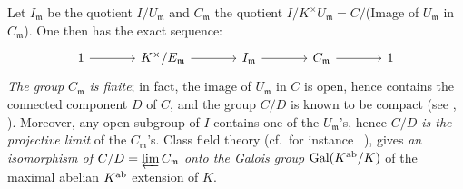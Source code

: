 Let $I_{\mathfrak{m}}$ be the quotient
$I/U_{\mathfrak{m}}$ and $C_{\mathfrak{m}}$ the
quotient $I/K^\times U_{\mathfrak{m}} = C/$(Image of $U_{\mathfrak{m}}$ in
$C_{\mathfrak{m}}$). One then has the exact sequence:
\[\begin{tikzcd}[sep=large]
	1 \rar & K^\times/E_{\mathfrak{m}} \rar & I_{\mathfrak{m}} \rar &
	C_{\mathfrak{m}} \rar & 1
\end{tikzcd}\]
\emph{The group $C_{\mathfrak{m}}$ is finite}; in fact, the image of
$U_{\mathfrak{m}}$ in $C$ is open, hence contains the connected component
$D$ of $C$, and the group $C/D$ is known to be compact (see
\cite{13}, \cite{44}).  Moreover, any open subgroup of $I$ contains one of the
$U_{\mathfrak{m}}$'s, hence \emph{$C/D$ is the projective limit} of the
$C_{\mathfrak{m}}$'s. Class field theory (cf.\ for instance
\citeauthor{6}~\cite{6}), gives \emph{an isomorphism of $C/D = \varprojlim
C_{\mathfrak{m}}$ onto the Galois group $\operatorname{Gal}(K^{\mathrm{ab}}/K)$} of the maximal
abelian $K^{\mathrm{ab}}$ extension of $K$.

